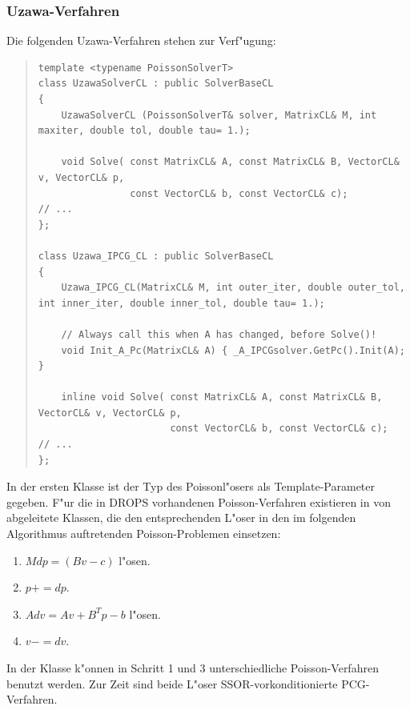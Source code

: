 \documentclass[11pt,a4paper]{article}
\newenvironment{Code}{\begin{quote}\scriptsize}{\end{quote}}
\begin{document}
\subsubsection{Uzawa-Verfahren}
Die folgenden Uzawa-Verfahren stehen zur Verf"ugung:
\begin{Code}
\begin{verbatim}
template <typename PoissonSolverT>
class UzawaSolverCL : public SolverBaseCL
{
    UzawaSolverCL (PoissonSolverT& solver, MatrixCL& M, int maxiter, double tol, double tau= 1.);

    void Solve( const MatrixCL& A, const MatrixCL& B, VectorCL& v, VectorCL& p,
                const VectorCL& b, const VectorCL& c);
// ...
};

class Uzawa_IPCG_CL : public SolverBaseCL
{
    Uzawa_IPCG_CL(MatrixCL& M, int outer_iter, double outer_tol, int inner_iter, double inner_tol, double tau= 1.);

    // Always call this when A has changed, before Solve()!
    void Init_A_Pc(MatrixCL& A) { _A_IPCGsolver.GetPc().Init(A); }

    inline void Solve( const MatrixCL& A, const MatrixCL& B, VectorCL& v, VectorCL& p,
                       const VectorCL& b, const VectorCL& c);
// ...
};
\end{verbatim}
\end{Code}

In der ersten Klasse ist der Typ des Poissonl"osers als Template-Parameter gegeben.
F"ur die in DROPS vorhandenen Poisson-Verfahren existieren in 
von  abgeleitete Klassen, die den entsprechenden L"oser in den
im folgenden Algorithmus auftretenden Poisson-Problemen einsetzen:
\begin{enumerate}
\item $M dp = (B v -c)$ l"osen.
\item $p += dp$.
\item $A dv = A v + B^Tp - b$ l"osen.
\item $v-= dv$.
\end{enumerate}
In der Klasse  k"onnen in Schritt 1 und 3
unterschiedliche Poisson-Verfahren benutzt werden. Zur Zeit sind beide
L"oser SSOR-vorkonditionierte PCG-Verfahren.
\end{document}
